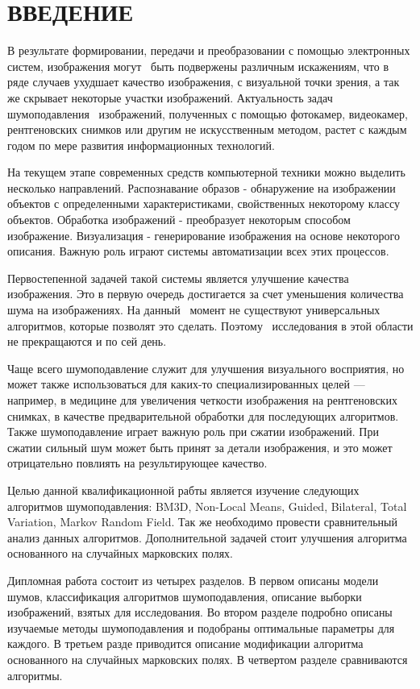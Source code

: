 \section*{ВВЕДЕНИЕ}
В результате формировании, передачи и преобразовании с помощью электронных систем, изображения могут 
быть подвержены различным искажениям, что в ряде случаев ухудшает качество изображения, с визуальной
точки зрения, а так же скрывает некоторые участки изображений.
Актуальность задач шумоподавления  изображений, полученных с помощью фотокамер, видеокамер, рентгеновских снимков или другим не искусственным методом, растет с каждым годом по мере развития информационных технологий.

На текущем этапе современных средств компьютерной техники можно выделить несколько направлений.
Распознавание образов - обнаружение на изображении объектов с определенными характеристиками, свойственных некоторому классу объектов. Обработка изображений - преобразует некоторым способом изображение. 
Визуализация - генерирование изображения на основе некоторого описания. Важную роль играют системы 
автоматизации всех этих процессов.

Первостепенной задачей такой системы является улучшение качества изображения. Это
в первую очередь достигается за счет уменьшения количества шума на изображениях. На данный 
момент не существуют универсальных алгоритмов, которые позволят это сделать. Поэтому 
исследования в этой области не прекращаются и по сей день.

Чаще всего шумоподавление служит для улучшения визуального восприятия, но
может также использоваться для каких-то специализированных целей — например, в
медицине для увеличения четкости изображения на рентгеновских снимках, в качестве
предварительной обработки для последующих алгоритмов. Также шумоподавление играет
важную роль при сжатии изображений. При сжатии сильный шум может быть принят за
детали изображения, и это может отрицательно повлиять на результирующее качество.\cite{web:Kalinkina}

Целью данной квалификационной рабты является изучение следующих алгоритмов шумоподавления: BM3D,
Non-Local Means, Guided, Bilateral, Total Variation, Markov Random Field. Так же необходимо
провести сравнительный анализ данных алгоритмов. Дополнительной задачей стоит улучшения алгоритма
основанного на случайных марковских полях.

Дипломная работа состоит из четырех разделов. В первом описаны модели шумов, классификация алгоритмов шумоподавления, описание выборки изображений, взятых для исследования. Во втором разделе подробно описаны изучаемые методы
шумоподавления и подобраны оптимальные параметры для каждого. В третьем разде приводится  описание модификации алгоритма основанного на случайных марковских полях. В четвертом разделе сравниваются алгоритмы.
